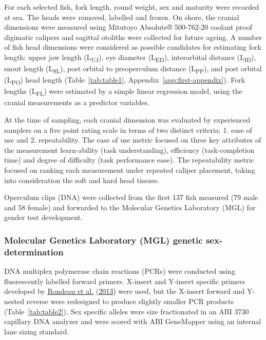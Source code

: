 \documentclass[12pt]{article}\usepackage[]{graphicx}\usepackage[]{color}
\begin{document}
For each selected fish, fork length, round weight, sex and maturity were recorded at sea. The heads were removed, labelled and frozen. On shore, the cranial dimensions were measured using Mitutoyo Absolute® 500-762-20 coolant proof digimatic calipers and sagittal otoliths were collected for future ageing. A number of fish head dimensions were considered as possible candidates for estimating fork length: upper jaw length (L\textsubscript{UJ}), eye diameter (L\textsubscript{ED}), interorbital distance (L\textsubscript{ID}), snout length (L\textsubscript{SL}), post orbital to preoperculum distance (L\textsubscript{PP}), and post orbital (L\textsubscript{PO}) head length (Table~\ref{tab:table1}, Appendix~\ref{app:first-appendix}). Fork lengths (L\textsubscript{FL}) were estimated by a simple linear regression model, using the cranial measurements as a predictor variables.

At the time of sampling, each cranial dimension was evaluated by experienced samplers on a five point rating scale in terms of two distinct criteria: 1. ease of use and 2. repeatability. The ease of use metric focused on three key attributes of the measurement learn-ability (task understanding), efficiency (task-completion time) and degree of difficulty (task performance ease). The repeatability metric focused on ranking each measurement under repeated caliper placement, taking into consideration the soft and hard head tissues.

Operculum clips (DNA) were collected from the first 137 fish measured (79 male and 58 female) and forwarded to the Molecular Genetics Laboratory (MGL) for gender test development.

\hypertarget{molecular-genetics-laboratory-mgl-genetic-sex-determination}{%
\subsubsection{Molecular Genetics Laboratory (MGL) genetic sex-determination}\label{molecular-genetics-laboratory-mgl-genetic-sex-determination}}

DNA multiplex polymerase chain reactions (PCRs) were conducted using fluorescently labelled forward primers. X-insert and Y-insert specific primers developed by \protect\hyperlink{ref-Rondeau2013}{Rondeau et al.} (\protect\hyperlink{ref-Rondeau2013}{2013}) were used, but the X-insert forward and Y-nested reverse were redesigned to produce slightly smaller PCR products (Table~\ref{tab:table2}). Sex specific alleles were size fractionated in an ABI 3730 capillary DNA analyzer and were scored with ABI GeneMapper using an internal lane sizing standard.
\end{document}
